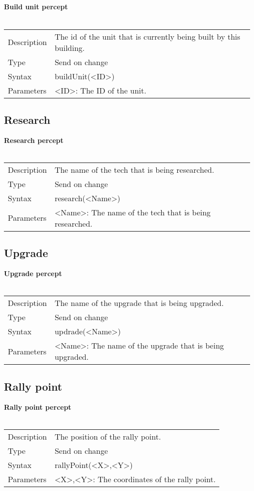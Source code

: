 \documentclass[english,11pt]{report}
\begin{document}
\subsection{}
\textbf{Build unit percept}\\
\\
\begin{tabularx}{\textwidth}{lX}
 Description & The id of the unit that is currently being built by this building. \\
 Type & Send on change \\
 Syntax & buildUnit(<ID>) \\
 Parameters &   <ID>: The ID of the unit.
\end{tabularx}

\subsection{Research}
\textbf{Research percept}\\
\\
\begin{tabularx}{\textwidth}{lX}
 Description & The name of the tech that is being researched. \\
 Type & Send on change \\
 Syntax & research(<Name>) \\
 Parameters &   <Name>: The name of the tech that is being researched.
\end{tabularx}

\subsection{Upgrade}
\textbf{Upgrade percept}\\
\\
\begin{tabularx}{\textwidth}{lX}
 Description & The name of the upgrade that is being upgraded. \\
 Type & Send on change \\
 Syntax & updrade(<Name>) \\
 Parameters &   <Name>: The name of the upgrade that is being upgraded.
\end{tabularx}

\subsection{Rally point}
\textbf{Rally point percept}\\
\\
\begin{tabularx}{\textwidth}{lX}
 Description & The position of the rally point. \\
 Type & Send on change \\
 Syntax & rallyPoint(<X>,<Y>) \\
 Parameters &   <X>,<Y>: The coordinates of the rally point.
\end{tabularx}\\
\\
\newpage
\end{document}
